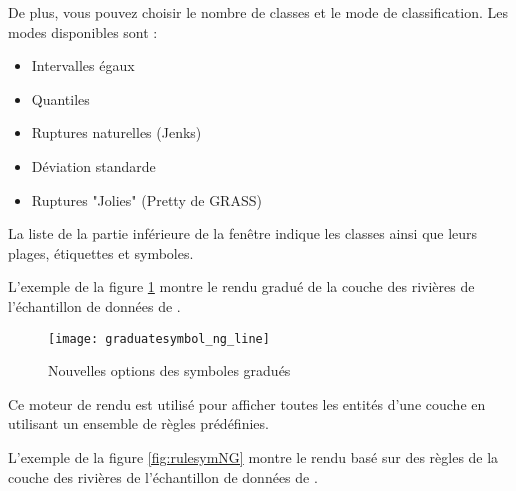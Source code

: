 De plus, vous pouvez choisir le nombre de classes et le mode de classification. Les modes disponibles sont :

\begin{itemize}
\item Intervalles égaux
\item Quantiles
\item Ruptures naturelles (Jenks)
\item Déviation standarde
\item  Ruptures "Jolies" (Pretty de GRASS)
\end{itemize}

La liste de la partie inférieure de la fenêtre indique les classes ainsi que leurs plages, étiquettes et symboles.

L'exemple de la figure \ref{fig:gradsymNG} montre le rendu gradué de la couche des rivières de l'échantillon de données de \qg.

\begin{figure}[ht]
   \centering
   \texttt{[image: graduatesymbol\_ng\_line]}
   \caption{Nouvelles options des symboles gradués \nixcaption}\label{fig:gradsymNG}
\end{figure}


Ce moteur de rendu est utilisé pour afficher toutes les entités d'une couche en utilisant un ensemble de règles prédéfinies.

L'exemple de la figure \ref{fig:rulesymNG} montre le rendu basé sur des règles de la couche des rivières de l'échantillon de données de \qg.

